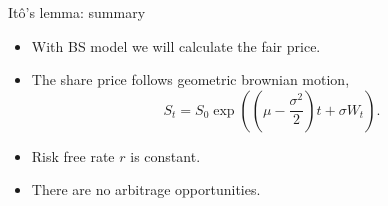 \begin{frame}{Itô's lemma: summary}
  
  \begin{itemize}[<+->]
      \item With BS model we will calculate the \alert{fair} price.
      \item The share price follows \alert{geometric} brownian motion, 
      \[
        S_t = S_0 \exp  \left(  \left( \mu - \frac{\sigma^2}{2}\right)t + \sigma W_t \right).
      \]

      \item \alert{Risk free rate} $r$ is constant.
      \item There are \alert{no arbitrage} opportunities.
  \end{itemize}
    
\end{frame}
  